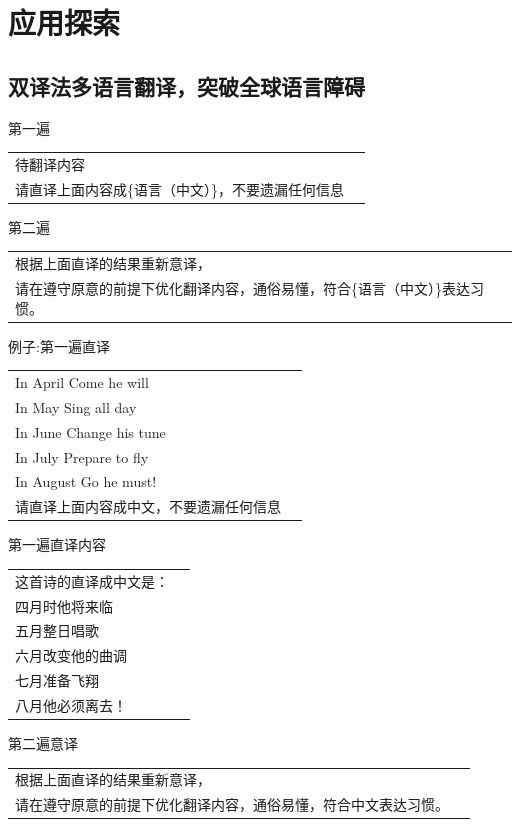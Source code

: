 \documentclass[12pt]{book}
\begin{document}
\chapter{应用探索}
\section{双译法多语言翻译，突破全球语言障碍}
\bigskip
第一遍

\begin{tabular}{|p{15cm}|p{3cm}|}
	\hline
{待翻译内容}\\
请直译上面内容成\{语言（中文）\}，不要遗漏任何信息\\
	\hline
\end{tabular}

\bigskip
第二遍

\begin{tabular}{|p{15cm}|p{3cm}|}
	\hline
根据上面直译的结果重新意译，\\
请在遵守原意的前提下优化翻译内容，通俗易懂，符合\{语言（中文）\}表达习惯。\\
	\hline
\end{tabular}

\bigskip
例子:第一遍直译

\begin{tabular}{|p{15cm}|p{3cm}|}
	\hline
   In April Come he will  \\
	In May Sing all day  \\
	In June Change his tune  \\
	In July Prepare to fly  \\
	In August Go he must! \\
请直译上面内容成{中文}，不要遗漏任何信息 \\
	\hline
\end{tabular}


\bigskip
第一遍直译内容

\begin{tabular}{|p{15cm}|p{3cm}|}
	\hline
这首诗的直译成中文是：\\
四月时他将来临\\
五月整日唱歌\\
六月改变他的曲调\\
七月准备飞翔\\
八月他必须离去！\\
	\hline
\end{tabular}


\bigskip
第二遍意译

\begin{tabular}{|p{15cm}|p{3cm}|}
	\hline
根据上面直译的结果重新意译，\\
请在遵守原意的前提下优化翻译内容，通俗易懂，符合{中文}表达习惯。\\
	\hline
\end{tabular}
\end{document}
